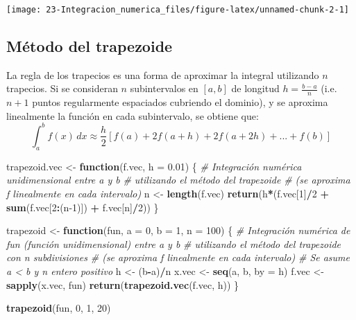 \documentclass[
]{book}
\newenvironment{Shaded}{\begin{snugshade}}{\end{snugshade}}
\newcommand{\CommentTok}[1]{\textcolor[rgb]{0.56,0.35,0.01}{\textit{#1}}}
\newcommand{\ControlFlowTok}[1]{\textcolor[rgb]{0.13,0.29,0.53}{\textbf{#1}}}
\newcommand{\DataTypeTok}[1]{\textcolor[rgb]{0.13,0.29,0.53}{#1}}
\newcommand{\DecValTok}[1]{\textcolor[rgb]{0.00,0.00,0.81}{#1}}
\newcommand{\FloatTok}[1]{\textcolor[rgb]{0.00,0.00,0.81}{#1}}
\newcommand{\KeywordTok}[1]{\textcolor[rgb]{0.13,0.29,0.53}{\textbf{#1}}}
\newcommand{\NormalTok}[1]{#1}
\newcommand{\OperatorTok}[1]{\textcolor[rgb]{0.81,0.36,0.00}{\textbf{#1}}}
\newcommand{\StringTok}[1]{\textcolor[rgb]{0.31,0.60,0.02}{#1}}
\theoremstyle{break}
\theoremstyle{definition}
\theoremstyle{definition}
\theoremstyle{definition}
\theoremstyle{remark}
\begin{document}
\begin{center}\texttt{[image: 23-Integracion\_numerica\_files/figure-latex/unnamed-chunk-2-1]} \end{center}

\hypertarget{muxe9todo-del-trapezoide}{%
\subsection{Método del trapezoide}\label{muxe9todo-del-trapezoide}}

La regla de los trapecios es una forma de aproximar la integral utilizando \(n\) trapecios.
Si se consideran \(n\) subintervalos en \([a,b]\) de longitud \(h= \frac{b-a}{n}\)
(i.e.~\(n + 1\) puntos regularmente espaciados cubriendo el dominio), y
se aproxima linealmente la función en cada subintervalo, se obtiene que:
\[\int_a^b f(x)\, dx \approx \frac{h}{2} [f(a)+2f(a+h)+2f(a+2h)+...+f(b)]\]

\begin{Shaded}
\begin{Highlighting}[]
\NormalTok{trapezoid.vec <-}\StringTok{ }\ControlFlowTok{function}\NormalTok{(f.vec, }\DataTypeTok{h =} \FloatTok{0.01}\NormalTok{) \{}
\CommentTok{# Integración numérica unidimensional entre a y b}
\CommentTok{# utilizando el método del trapezoide }
\CommentTok{# (se aproxima f linealmente en cada intervalo)}
\NormalTok{  n <-}\StringTok{ }\KeywordTok{length}\NormalTok{(f.vec) }
  \KeywordTok{return}\NormalTok{(h}\OperatorTok{*}\NormalTok{(f.vec[}\DecValTok{1}\NormalTok{]}\OperatorTok{/}\DecValTok{2} \OperatorTok{+}\StringTok{ }\KeywordTok{sum}\NormalTok{(f.vec[}\DecValTok{2}\OperatorTok{:}\NormalTok{(n}\DecValTok{-1}\NormalTok{)]) }\OperatorTok{+}\StringTok{ }\NormalTok{f.vec[n]}\OperatorTok{/}\DecValTok{2}\NormalTok{))}
\NormalTok{\}}

\NormalTok{trapezoid <-}\StringTok{ }\ControlFlowTok{function}\NormalTok{(fun, }\DataTypeTok{a =} \DecValTok{0}\NormalTok{, }\DataTypeTok{b =} \DecValTok{1}\NormalTok{, }\DataTypeTok{n =} \DecValTok{100}\NormalTok{) \{}
\CommentTok{# Integración numérica de fun (función unidimensional) entre a y b}
\CommentTok{# utilizando el método del trapezoide con n subdivisiones}
\CommentTok{# (se aproxima f linealmente en cada intervalo)}
\CommentTok{# Se asume a < b y n entero positivo }
\NormalTok{  h <-}\StringTok{ }\NormalTok{(b}\OperatorTok{-}\NormalTok{a)}\OperatorTok{/}\NormalTok{n}
\NormalTok{  x.vec <-}\StringTok{ }\KeywordTok{seq}\NormalTok{(a, b, }\DataTypeTok{by =}\NormalTok{ h)}
\NormalTok{  f.vec <-}\StringTok{ }\KeywordTok{sapply}\NormalTok{(x.vec, fun)}
  \KeywordTok{return}\NormalTok{(}\KeywordTok{trapezoid.vec}\NormalTok{(f.vec, h))}
\NormalTok{\}}

\KeywordTok{trapezoid}\NormalTok{(fun, }\DecValTok{0}\NormalTok{, }\DecValTok{1}\NormalTok{, }\DecValTok{20}\NormalTok{)}
\end{Highlighting}
\end{Shaded}
\end{document}
